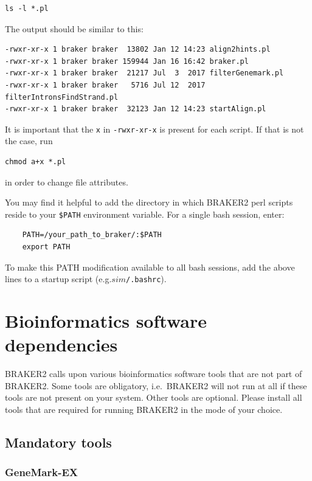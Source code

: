 \documentclass[a4paper,10pt]{report}
\begin{document}
\begin{verbatim}
ls -l *.pl
\end{verbatim}

The output should be similar to this:

\begin{verbatim}
-rwxr-xr-x 1 braker braker  13802 Jan 12 14:23 align2hints.pl
-rwxr-xr-x 1 braker braker 159944 Jan 16 16:42 braker.pl
-rwxr-xr-x 1 braker braker  21217 Jul  3  2017 filterGenemark.pl
-rwxr-xr-x 1 braker braker   5716 Jul 12  2017 filterIntronsFindStrand.pl
-rwxr-xr-x 1 braker braker  32123 Jan 12 14:23 startAlign.pl
\end{verbatim}

It is important that the \texttt{x} in \texttt{-rwxr-xr-x} is present for each script. If that is not the case, run

\begin{verbatim}
chmod a+x *.pl
\end{verbatim}

in order to change file attributes.

You may find it helpful to add the directory in which BRAKER2 perl scripts reside to 
    your \texttt{\$PATH} environment variable. For a single bash session, enter:

    \begin{verbatim}
    PATH=/your_path_to_braker/:$PATH
    export PATH
    \end{verbatim}
    
To make this PATH modification available to all bash sessions, add the above lines to a startup script (e.g.\texttt{$sim$/.bashrc}).

\section{Bioinformatics software dependencies}

BRAKER2 calls upon various bioinformatics software tools that are not part of BRAKER2. Some tools are obligatory, i.e.~BRAKER2 will not run at all if these tools are not present on your system. Other tools are optional. Please install all tools that are required for running BRAKER2 in the mode of your choice.

\subsection{Mandatory tools}

\subsubsection{GeneMark-EX}
\end{document}
